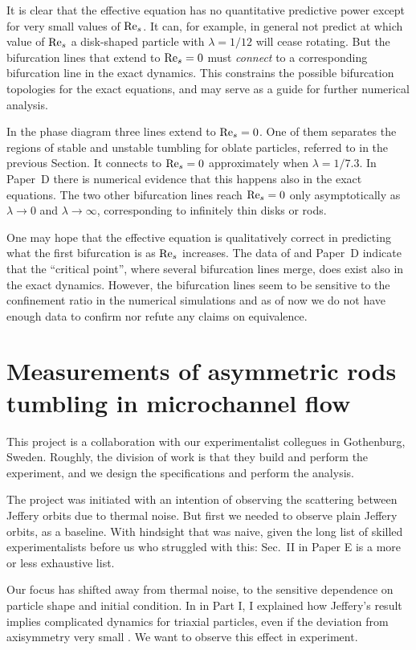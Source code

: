 \documentclass[thesis.tex]{subfiles}
\begin{document}
It is clear that the effective equation has no quantitative predictive power except for very small values of $\textrm{Re}_s$. It can, for example, in general not predict at which value of $\textrm{Re}_s$ a disk-shaped particle with $\lambda=1/12$ will cease rotating. But the bifurcation lines that extend to $\textrm{Re}_s=0$ must \emph{connect} to a corresponding bifurcation line in the exact dynamics. This constrains the possible bifurcation topologies for the exact equations, and may serve as a guide for further numerical analysis.

In the phase diagram three lines extend to $\textrm{Re}_s=0$. One of them separates the regions of stable and unstable tumbling for oblate particles, referred to in the previous Section. It connects to $\textrm{Re}_s=0$ approximately when $\lambda=1/7.3$. In Paper~D there is numerical evidence that this happens also in the exact equations. The two other bifurcation lines reach $\textrm{Re}_s=0$ only asymptotically as $\lambda\to0$ and $\lambda\to\infty$, corresponding to infinitely thin disks or rods.

One may hope that the effective equation is qualitatively correct in predicting what the first bifurcation is as $\textrm{Re}_s$ increases. The data of \citet{rosen2015b} and Paper~D indicate that the ``critical point'', where several bifurcation lines merge, does exist also in the exact dynamics. However, the bifurcation lines seem to be sensitive to the confinement ratio in the numerical simulations and as of now we do not have enough data to confirm nor refute any claims on equivalence.

\chapter[Measurements of asymmetric rods]{Measurements of asymmetric rods tumbling in microchannel flow}

This project is a collaboration with our experimentalist collegues in Gothenburg, Sweden. Roughly, the division of work is that they build and perform the experiment, and we design the specifications and perform the analysis.

The project was initiated with an intention of observing the scattering between Jeffery orbits due to thermal noise. But first we needed to observe plain Jeffery orbits, as a baseline. With hindsight that was naive, given the long list of skilled experimentalists before us who struggled with this: Sec.~II in Paper E is a more or less exhaustive list. 

Our focus has shifted away from thermal noise, to the sensitive dependence on particle shape and initial condition. In  in Part I, I explained how Jeffery's result implies complicated dynamics for triaxial particles, even if the deviation from axisymmetry very small \cite{hinch1979,yarin1997}. We want to observe this effect in experiment.
\end{document}

